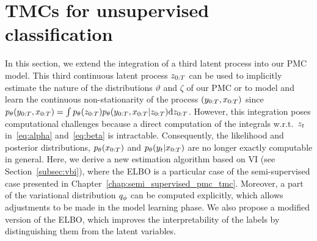 \section{TMCs for unsupervised classification}
\label{sec-tmc}



In this section, we extend the integration of a third latent process into our
PMC model. This third continuous latent process $z_{0:T}$ can be used to implicitly estimate 
the nature of the distributions $\vartheta$ and $\zeta$ of our PMC or to model and learn the
continuous non-stationarity of the process $(y_{0:T}, x_{0:T})$ since
$p_{\theta}(y_{0:T},x_{0:T})=\int p_{\theta}(z_{0:T}) p_{\theta}(y_{0:T},x_{0:
T}|z_{0:T}) {\rm d}z_{0:T}$. 
However, this integration poses computational challenges 
because a direct computation of the integrals w.r.t.~$z_t$ in~\eqref{eq:alpha}
 and~\eqref{eq:beta} is intractable.
Consequently, the likelihood and posterior distributions, 
$p_{\theta}(x_{0:T})$ and $p_{\theta}(y_t|x_{0:T})$ are no longer exactly computable in
general. 
Here, we derive a new estimation algorithm based on 
VI (see Section~\ref{subsec:vbi}), 
where the ELBO is a particular case of the semi-supervised case presented in
Chapter~\ref{chap:semi_supervised_pmc_tmc}.
Moreover, a part of the variational distribution $q_\phi$ can be computed
explicitly, which allows adjustments to be made in the model
learning phase. We also propose a modified version of the ELBO, 
which improves the interpretability of the labels by distinguishing them 
from the latent variables.





